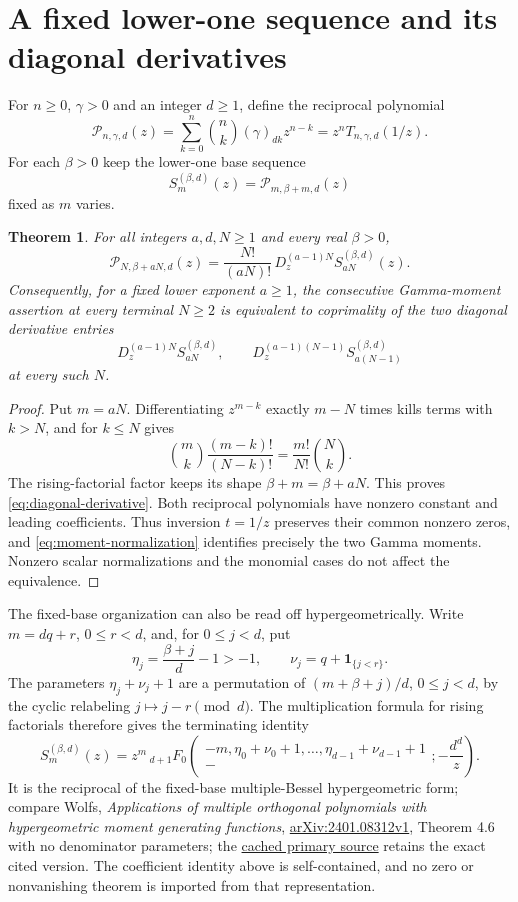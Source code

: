 \documentclass[11pt]{article}
\newtheorem{theorem}{Theorem}
\begin{document}
\section{A fixed lower-one sequence and its diagonal derivatives}
For $n\ge0$, $\gamma>0$ and an integer $d\ge1$, define the
reciprocal polynomial
\[
 \mathcal P_{n,\gamma,d}(z)=
 \sum_{k=0}^n\binom nk(\gamma)_{dk}z^{n-k}
 =z^nT_{n,\gamma,d}(1/z).
\]
For each $\beta>0$ keep the lower-one base sequence
\[
 S_m^{(\beta,d)}(z)=\mathcal P_{m,\beta+m,d}(z)
\]
fixed as $m$ varies.
\begin{theorem}\label{thm:diagonal-derivatives}
For all integers $a,d,N\ge1$ and every real $\beta>0$,
\[
 \mathcal P_{N,\beta+aN,d}(z)=
 \frac{N!}{(aN)!}\,
 D_z^{(a-1)N}S_{aN}^{(\beta,d)}(z).                         \tag{9}\label{eq:diagonal-derivative}
\]
Consequently, for a fixed lower exponent $a\ge1$, the consecutive
Gamma-moment assertion at every terminal $N\ge2$ is equivalent to
coprimality of the two diagonal derivative entries
\[
 D_z^{(a-1)N}S_{aN}^{(\beta,d)},\qquad
 D_z^{(a-1)(N-1)}S_{a(N-1)}^{(\beta,d)}
\]
at every such $N$.
\end{theorem}
\begin{proof}
Put $m=aN$. Differentiating $z^{m-k}$ exactly $m-N$ times
kills terms with $k>N$, and for $k\le N$ gives
\[
 \binom mk\frac{(m-k)!}{(N-k)!}
 =\frac{m!}{N!}\binom Nk .
\]
The rising-factorial factor keeps its shape $\beta+m=\beta+aN$.
This proves \eqref{eq:diagonal-derivative}. Both reciprocal polynomials have nonzero constant
and leading coefficients. Thus inversion $t=1/z$ preserves their
common nonzero zeros, and \eqref{eq:moment-normalization} identifies precisely the two Gamma
moments. Nonzero scalar normalizations and the monomial cases do
not affect the equivalence.
\end{proof}

The fixed-base organization can also be read off hypergeometrically.
Write $m=dq+r$, $0\le r<d$, and, for $0\le j<d$, put
\[
 \eta_j=\frac{\beta+j}{d}-1>-1,\qquad
 \nu_j=q+\mathbf1_{\{j<r\}} .
\]
The parameters $\eta_j+\nu_j+1$ are a permutation of
$(m+\beta+j)/d$, $0\le j<d$, by the cyclic relabeling
$j\mapsto j-r\pmod d$.
The multiplication formula for rising factorials therefore gives
the terminating identity
\[
 S_m^{(\beta,d)}(z)=z^m\,
 {}_{d+1}F_0\left(
 \begin{matrix}-m,\eta_0+\nu_0+1,\ldots,\eta_{d-1}+\nu_{d-1}+1\\-
 \end{matrix};-\frac{d^d}{z}\right).
\]
It is the reciprocal of the fixed-base multiple-Bessel
hypergeometric form; compare Wolfs,
\emph{Applications of multiple orthogonal polynomials with hypergeometric
moment generating functions},
\href{https://arxiv.org/pdf/2401.08312v1}{arXiv:2401.08312v1},
Theorem 4.6 with no denominator parameters; the
\href{sources/wolfs-2024-multiple-orthogonal-2401.08312v1.pdf}{cached primary source}
retains the exact cited version.
The coefficient identity above is self-contained, and no zero or
nonvanishing theorem is imported from that representation.
\end{document}
